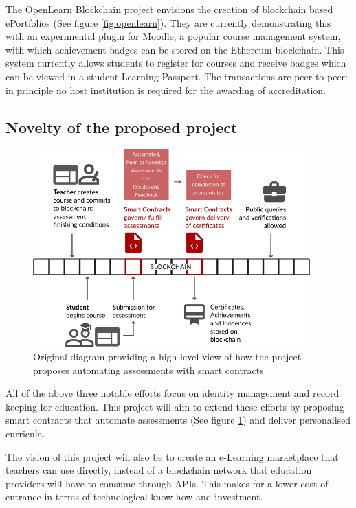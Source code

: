 The OpenLearn Blockchain project envisions the creation of blockchain based ePortfolios (See figure 
\ref{fig:openlearn}). They are currently demonstrating this with an experimental plugin for Moodle, 
a popular course management system, with which achievement badges can be stored on the Ethereum 
blockchain. This system currently allows students to register for courses and receive badges which 
can be viewed in a student Learning Passport. The transactions are peer-to-peer: in principle no 
host institution is required for the awarding of accreditation. \citep{sharples2016blockchain}

\subsection{Novelty of the proposed project}

\begin{figure}[!h] 
    \centering    
    \includegraphics[width=0.95\textwidth]{moocon}
    \caption[How smart contracts automates assessments]
        {Original diagram providing a high level view of how the project proposes automating assessments 
        with smart contracts}
    \label{fig:moocon_assess}
\end{figure}

All of the above three notable efforts focus on identity management and record keeping for education. 
This project will aim to extend these efforts by proposing smart contracts that automate assessments 
(See figure \ref{fig:moocon_assess}) and deliver personalised curricula. 

The vision of this project will also be to create an e-Learning marketplace that teachers can use directly, 
instead of a blockchain network that education providers will have to consume through APIs. This makes for a 
lower cost of entrance in terms of technological know-how and investment.

